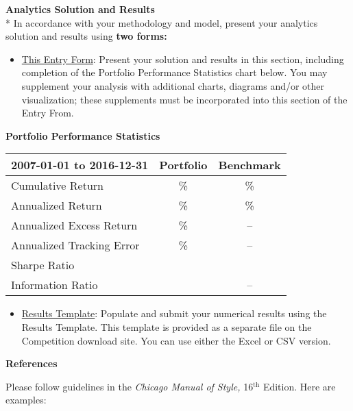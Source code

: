 \documentclass[11pt]{article}
\begin{document}
\textbf{Analytics Solution and Results}\\*
In accordance with your methodology and model, present your analytics 
solution and results using \textbf{two forms:}

\begin{itemize}
\item \underline {This Entry Form}: Present your solution and results in this section, including completion of the Portfolio Performance Statistics chart below. You may supplement your analysis with additional charts, diagrams and/or other visualization; these supplements must be incorporated into this section of the Entry From.
\end{itemize}

\begin{center}
\textbf{Portfolio Performance Statistics}\vspace*{-14pt}
\end{center}
\begin{table}[htbp]
\def\arraystretch{1.4}
\begin{center}
\begin{tabular}{|l|c|c|}
\hline
\textbf{2007-01-01 to 2016-12-31}& 
\textbf{Portfolio}& 
\textbf{Benchmark} \\
\hline
Cumulative Return& 
{\%}& 
{\%} \\
\hline
Annualized Return& 
{\%}& 
{\%} \\
\hline
Annualized Excess Return& 
{\%}& 
-- \\
\hline
Annualized Tracking Error& 
{\%}& 
-- \\
\hline
Sharpe Ratio& 
& 
 \\
\hline
Information Ratio& 
& 
-- \\
\hline
\end{tabular}
\label{tab1}
\end{center}
\end{table}

\begin{itemize}
\item \underline {Results Template}: Populate and submit your numerical results using the Results Template. This template is provided as a separate file on the Competition download site. You can use either the Excel or CSV version.
\end{itemize}

\textbf{References}

\bgroup
\parskip0pt

Please follow guidelines in the \textit{Chicago Manual of Style,} 16$^{\text{th}}$ Edition. Here are examples: 
\end{document}
